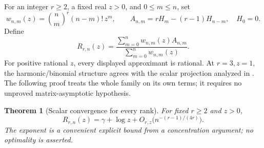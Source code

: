 \documentclass[11pt,a4paper]{article}
\numberwithin{equation}{section}
\newtheorem{theorem}{Theorem}[section]
\theoremstyle{definition}
\theoremstyle{remark}
\begin{document}
For an integer $r\ge2$, a fixed real $z>0$, and $0\le m\le n$, set
\[
 w_{n,m}(z)=\binom nm^r(n-m)!\,z^m,
 \qquad A_{n,m}=rH_m-(r-1)H_{n-m},\quad H_0=0.
\]
Define
\begin{equation}\label{cmf:scalar-approx}
 R_{r,n}(z)=
 \frac{\sum_{m=0}^n w_{n,m}(z)A_{n,m}}
      {\sum_{m=0}^n w_{n,m}(z)}.
\end{equation}
For positive rational $z$, every displayed approximant is rational.
At $r=3,z=1$, the harmonic/binomial structure agrees with the
scalar projection analyzed in \cite{Integrated2026}. The following
proof treats the whole family on its own terms; it requires no
unproved matrix-asymptotic hypothesis.

\begin{theorem}[Scalar convergence for every rank]
\label{cmf:scalar-convergence}
For fixed $r\ge2$ and $z>0$,
\begin{equation}\label{cmf:scalar-rate}
 R_{r,n}(z)=\gamma+\log z
       +O_{r,z}\bigl(n^{-(r-1)/(4r)}\bigr).
\end{equation}
The exponent is a convenient explicit bound from a concentration
argument; no optimality is asserted.
\end{theorem}
\end{document}

